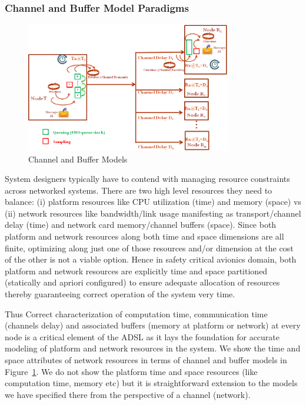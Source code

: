 \subsubsection{Channel and Buffer Model Paradigms}
\label{ssec:channel}

\begin{figure}
\begin{center}
\includegraphics[width=0.8\textwidth]{figures/channel_buffer.png}
\caption{Channel and Buffer Models}
\label{fig:channel_buffer}
\end{center}
\end{figure}

System designers typically have to contend with managing resource constraints across networked systems. There are two high level resources they need to balance: (i) platform resources like CPU utilization (time) and memory (space) vs (ii) network resources like bandwidth/link usage manifesting as transport/channel delay (time) and network card memory/channel buffers (space). Since both platform and network resources along both time and space dimensions are all finite, optimizing along just one of those resources and/or dimension at the cost of the other is not a viable option.  Hence in safety critical avionics domain, both platform and network resources are explicitly time and space partitioned (statically and apriori configured) to ensure adequate allocation of resources thereby guaranteeing correct operation of the system very time. 

Thus Correct characterization of computation time, communication time (channels delay) and associated buffers (memory at platform or network) at every node is a critical element of the ADSL as it lays the foundation for accurate modeling of platform and network resources in the system.  We show the time and space attributes of network resources in terms of channel and buffer models in Figure~\ref{fig:channel_buffer}. We do not show the platform time and space resources (like computation time, memory etc) but it is straightforward extension to the models we have specified there from the perspective of a channel (network). 

